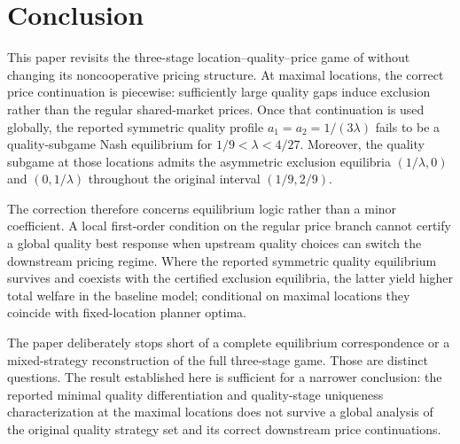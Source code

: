 \section{Conclusion}\label{sec:conclusion}

This paper revisits the three-stage location--quality--price game of \citet{Economides1989} without changing its noncooperative pricing structure. At maximal locations, the correct price continuation is piecewise: sufficiently large quality gaps induce exclusion rather than the regular shared-market prices. Once that continuation is used globally, the reported symmetric quality profile $a_1=a_2=1/(3\lambda)$ fails to be a quality-subgame Nash equilibrium for $1/9<\lambda<4/27$. Moreover, the quality subgame at those locations admits the asymmetric exclusion equilibria $(1/\lambda,0)$ and $(0,1/\lambda)$ throughout the original interval $(1/9,2/9)$.

The correction therefore concerns equilibrium logic rather than a minor coefficient. A local first-order condition on the regular price branch cannot certify a global quality best response when upstream quality choices can switch the downstream pricing regime. Where the reported symmetric quality equilibrium survives and coexists with the certified exclusion equilibria, the latter yield higher total welfare in the baseline model; conditional on maximal locations they coincide with fixed-location planner optima.

The paper deliberately stops short of a complete equilibrium correspondence or a mixed-strategy reconstruction of the full three-stage game. Those are distinct questions. The result established here is sufficient for a narrower conclusion: the reported minimal quality differentiation and quality-stage uniqueness characterization at the maximal locations does not survive a global analysis of the original quality strategy set and its correct downstream price continuations.
